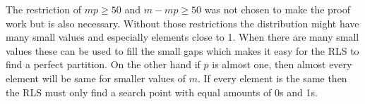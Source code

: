 The restriction of $mp\ge50$ and $m-mp\ge50$ was not chosen to make the proof work but is also necessary.
Without those restrictions the distribution might have many small values and especially elements close to 1.
When there are many small values these can be used to fill the small gaps which makes it easy for the RLS to find a perfect partition.
On the other hand if $p$ is almost one, then almost every element will be same for smaller values of $m$.
If every element is the same then the RLS must only find a search point with equal amounts of 0s and 1s.